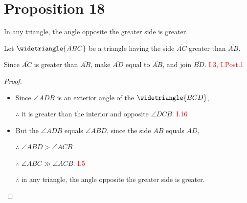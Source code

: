 
\section*{Proposition 18}
 
\begin{thm}
In any triangle, the angle opposite the greater side is greater.
\end{thm}

Let $\widetriangle{ABC}$ be a triangle having the side $\overline{AC}$ greater than $\overline{AB}$.

\begin{figure}[H]
	\caption{}
\end{figure}

Since $\overline{AC}$ is greater than $\overline{AB}$, make $\overline{AD}$ equal to $\overline{AB}$, and join $\overline{BD}$. \hfill\textcolor{red}{I.3, I.Post.1}

\begin{figure}[H]
	\caption{}
\end{figure}

\begin{proof}

\begin{itemize}

\item Since $\angle{ADB}$ is an exterior angle of the $\widetriangle{BCD}$,

\item[$\therefore$] it is greater than the interior and opposite $\angle{DCB}$. \hfill\textcolor{red}{I.16}

\item But the $\angle{ADB}$ equals $\angle{ABD}$, since the side $\overline{AB}$ equals $\overline{AD}$, 

\item[$\therefore$] $\angle{ABD} > \angle{ACB}$

\item[$\therefore$] $\angle{ABC} \gg \angle{ACB}$. \hfill\textcolor{red}{I.5}

\item[$\therefore$] in any triangle, the angle opposite the greater side is greater.

\end{itemize}

\end{proof}
 
\clearpage
